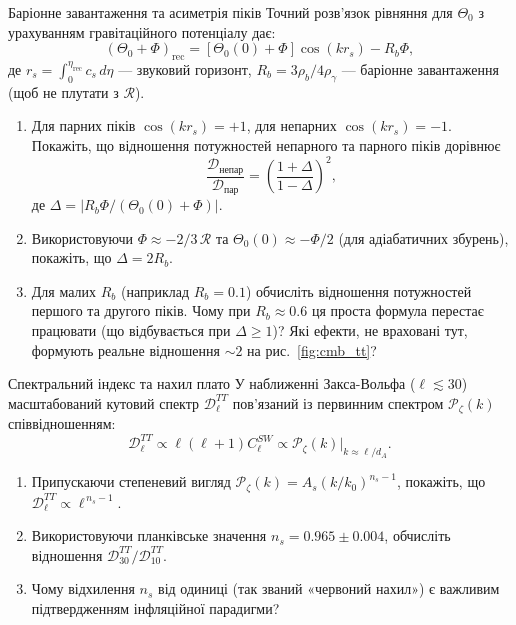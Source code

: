 \begin{problem}{Баріонне завантаження та асиметрія піків}
Точний розв'язок рівняння для $\Theta_0$ з урахуванням гравітаційного
потенціалу дає:
\[
(\Theta_0 + \Phi)_{\text{rec}} = [\Theta_0(0)+\Phi]\cos(k r_s) - R_b\Phi,
\]
де $r_s = \int_0^{\eta_{\text{rec}}} c_s\,d\eta$ --- звуковий горизонт,
$R_b = 3\rho_b/4\rho_\gamma$ --- баріонне завантаження (щоб не плутати з $\mathcal{R}$).

\begin{enumerate}
    \item Для парних піків $\cos(k r_s) = +1$, для непарних $\cos(k r_s) = -1$.
          Покажіть, що відношення потужностей непарного та парного піків дорівнює
          \[
          \frac{\mathcal{D}_{\text{непар}}}{\mathcal{D}_{\text{пар}}} =
          \left(\frac{1+\Delta}{1-\Delta}\right)^2,
          \]
          де $\Delta = |R_b\Phi/(\Theta_0(0)+\Phi)|$.
    \item Використовуючи $\Phi \approx -2/3\,\mathcal{R}$ та
          $\Theta_0(0) \approx -\Phi/2$ (для адіабатичних збурень),
          покажіть, що $\Delta = 2R_b$.
    \item Для малих $R_b$ (наприклад $R_b=0.1$) обчисліть відношення потужностей
          першого та другого піків. Чому при $R_b\approx 0.6$ ця проста формула
          перестає працювати (що відбувається при $\Delta\ge1$)? Які ефекти, не враховані тут, формують реальне відношення $\sim2$ на рис.~\ref{fig:cmb_tt}?
\end{enumerate}
\end{problem}


\begin{problem}{Спектральний індекс та нахил плато}
У наближенні Закса-Вольфа ($\ell \lesssim 30$) масштабований
кутовий спектр $\mathcal{D}_\ell^{TT}$ пов'язаний із первинним
спектром $\mathcal{P}_\zeta(k)$ співвідношенням:
\[
\mathcal{D}_\ell^{TT} \propto \ell(\ell+1) C_\ell^{SW} \propto \mathcal{P}_\zeta(k)\Big|_{k \approx \ell/d_A}.
\]

\begin{enumerate}
    \item Припускаючи степеневий вигляд $\mathcal{P}_\zeta(k) = A_s (k/k_0)^{n_s-1}$,
          покажіть, що $\mathcal{D}_\ell^{TT} \propto \ell^{\,n_s-1}$.
    \item Використовуючи планківське значення $n_s = 0.965 \pm 0.004$,
          обчисліть відношення $\mathcal{D}_{30}^{TT} / \mathcal{D}_{10}^{TT}$.
    \item Чому відхилення $n_s$ від одиниці (так званий «червоний нахил»)
          є важливим підтвердженням інфляційної парадигми?
\end{enumerate}
\end{problem}

